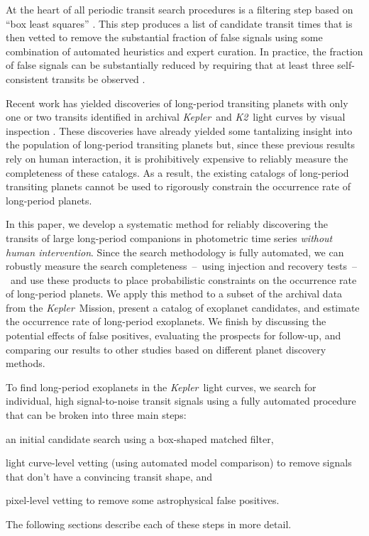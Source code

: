 \documentclass[manuscript, letterpaper]{aastex6}
\makeatletter
\let\origsection\section
\renewcommand\section{\@ifstar{\starsection}{\nostarsection}}
\newcommand\nostarsection[1]{\sectionprelude\origsection{#1}}
\newcommand\starsection[1]{\sectionprelude\origsection*{#1}}
\newcommand\sectionprelude{\vspace{1em}}
\newcommand{\project}[1]{\textsl{#1}}
\newcommand{\kepler}{\project{Kepler}}
\newcommand{\KT}{\project{K2}}
\newcommand{\bls}{\project{BLS}}
\newcommand{\sectlabel}[1]{\label{sect:#1}}
\newcommand{\paper}{paper}
\makeatother
\begin{document}
At the heart of all periodic transit search procedures is a filtering step
based on ``box least squares'' \citep[\bls;][]{Kovacs:2002}.
This step produces a list of candidate transit times that is then vetted to
remove the substantial fraction of false signals using some combination of
automated heuristics and expert curation.
In practice, the fraction of false signals can be substantially reduced by
requiring that at least three self-consistent transits be observed
\citep{Petigura:2013, Burke:2014, Rowe:2015, Coughlin:2016}.

Recent work has yielded discoveries of long-period transiting planets with
only one or two transits identified in archival \kepler\ and \KT\ light curves
by visual inspection \citep{Wang:2013, Kipping:2014a, Osborn:2016,
Kipping:2016, Uehara:2016, Wang:2015}.
These discoveries have already yielded some tantalizing insight into the
population of long-period transiting planets but, since these previous results
rely on human interaction, it is prohibitively expensive to reliably measure
the completeness of these catalogs.
As a result, the existing catalogs of long-period transiting planets cannot be
used to rigorously constrain the occurrence rate of long-period planets.

In this \paper, we develop a systematic method for reliably discovering the
transits of large long-period companions in photometric time series
\emph{without human intervention}.
Since the search methodology is fully automated, we can robustly measure the
search completeness~--~using injection and recovery tests~--~and use these
products to place probabilistic constraints on the occurrence rate of
long-period planets.
We apply this method to a subset of the archival data from the \kepler\
Mission, present a catalog of exoplanet candidates, and estimate the
occurrence rate of long-period exoplanets.
We finish by discussing the potential effects of false positives, evaluating the
prospects for follow-up, and comparing our results to other studies
based on different planet discovery methods.


\section{A fully automated search method}\sectlabel{search}

To find long-period exoplanets in the \kepler\ light curves, we search for
individual, high signal-to-noise transit signals using a fully automated
procedure that can be broken into three main steps:
\begin{enumerate}
{\item an initial candidate search using a box-shaped matched filter,}
{\item light curve-level vetting (using automated model comparison) to remove
signals that don't have a convincing transit shape, and}
{\item pixel-level vetting to remove some astrophysical false positives.}
\end{enumerate}
The following sections describe each of these steps in more detail.
\end{document}

